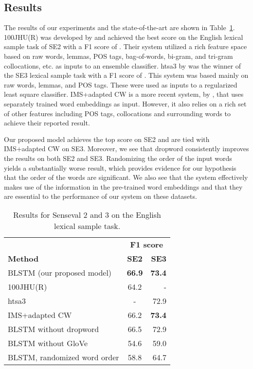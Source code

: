 \documentclass[11pt]{article}
\newcommand{\Tab}[1]{Table~\ref{#1}}
\def\SEtwo{SE2}
\def\SEthree{SE3}
\def\dropword{dropword}
\def\glove{GloVe}
\def\SEtwoBest{100JHU(R)}
\def\SEthreeBest{htsa3}
\def\IMS{IMS+adapted CW}
\def\oursystem{BLSTM}
\def\dropword{dropword}
\def\randomwordorder{randomized word order}
\begin{document}
\subsection{Results}
The results of our experiments and the state-of-the-art are shown in \Tab{tbl:results}. \SEtwoBest{} was developed by  and achieved the best score on the English lexical sample task of \SEtwo{}{} with a F1 score of . Their system utilized a rich feature space based on raw words, lemmas, POS tags, bag-of-words, bi-gram, and tri-gram collocations, etc. as inputs to an ensemble classifier. \SEthreeBest{} by  was the winner of the \SEthree{} lexical sample task with a F1 score of . This system was based mainly on raw words, lemmas, and POS tags. These were used as inputs to a regularized least square classifier. \IMS{} is a more recent system, by , that uses separately trained word embeddings as input. However, it also relies on a rich set of other features including POS tags, collocations and surrounding words to achieve their reported result.

Our proposed model achieves the top score on \SEtwo{} and are tied with \IMS{} on \SEthree. Moreover, we see that \dropword{} consistently improves the results on both \SEtwo{} and \SEthree{}. Randomizing the order of the input words yields a substantially worse result, which provides evidence for our hypothesis that the order of the words are significant. We also see that the system effectively makes use of the information in the pre-trained word embeddings and that they are essential to the performance of our system on these datasets. 

\begin{table}[tbh]
\centering
\begin{tabular*}{0.9\textwidth}{@{\extracolsep{\fill} } lcr }
\toprule 
& \multicolumn{2}{c}{\bf F1 score} \\
\bf Method & \bf \SEtwo & \bf \SEthree \\
\midrule
\oursystem{} (our proposed model) & \bf 66.9 & \bf 73.4 \\
\midrule
\SEtwoBest & 64.2 & - \\
\SEthreeBest & - & 72.9 \\
\IMS & 66.2 & \bf 73.4 \\
\midrule
\oursystem{} without \dropword & 66.5 & 72.9 \\
\oursystem{} without \glove & 54.6 & 59.0  \\
\oursystem{}, \randomwordorder & 58.8 & 64.7 \\
\bottomrule
\end{tabular*}
\caption{Results for Senseval 2 and 3 on the English lexical sample task.}
\label{tbl:results}
\end{table}
%
\end{document}
